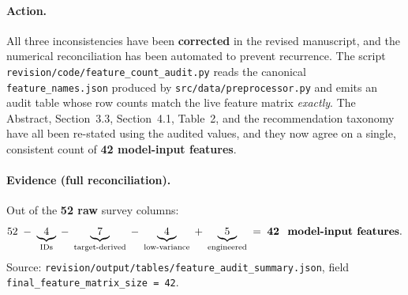 \documentclass[11pt,a4paper]{article}
\newcommand{\filebox}[1]{\texttt{\small #1}}
\newcommand{\sectref}[1]{Section~#1}
\newcommand{\stress}[1]{\textbf{#1}}
\begin{document}
\paragraph{Action.} All three inconsistencies have been \stress{corrected} in the revised manuscript, and the numerical reconciliation has been automated to prevent recurrence. The script \filebox{revision/code/feature\_count\_audit.py} reads the canonical \filebox{feature\_names.json} produced by \filebox{src/data/preprocessor.py} and emits an audit table whose row counts match the live feature matrix \emph{exactly}. The Abstract, \sectref{3.3}, \sectref{4.1}, Table~2, and the recommendation taxonomy have all been re-stated using the audited values, and they now agree on a single, consistent count of \stress{42 model-input features}.

\paragraph{Evidence (full reconciliation).} Out of the \stress{52 raw} survey columns:
\[
52 \;-\; \underbrace{4}_{\text{IDs}} \;-\; \underbrace{7}_{\text{target-derived}} \;-\; \underbrace{4}_{\text{low-variance}} \;+\; \underbrace{5}_{\text{engineered}} \;=\; \stress{42 \text{ model-input features}}.
\]
Source: \filebox{revision/output/tables/feature\_audit\_summary.json}, field \texttt{final\_feature\_matrix\_size = 42}.
\end{document}
